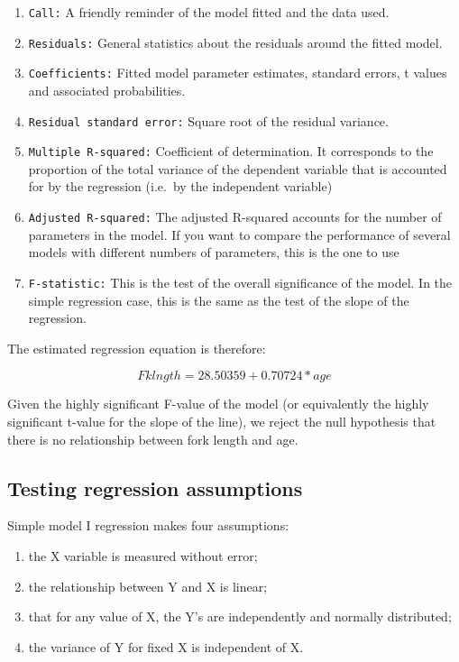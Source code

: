 \documentclass[
  12pt,
]{book}
\providecommand{\tightlist}{%
  \setlength{\itemsep}{0pt}\setlength{\parskip}{0pt}}
\begin{document}
\begin{enumerate}
\def\labelenumi{\arabic{enumi}.}
\tightlist
\item
  \texttt{Call:} A friendly reminder of the model fitted and the data used.
\item
  \texttt{Residuals:} General statistics about the residuals around the fitted model.
\item
  \texttt{Coefficients:} Fitted model parameter estimates, standard errors, t values and associated probabilities.
\item
  \texttt{Residual\ standard\ error:} Square root of the residual variance.
\item
  \texttt{Multiple\ R-squared:} Coefficient of determination. It corresponds to the proportion of the total variance of the dependent variable that is accounted for by the regression (i.e.~by the independent variable)
\item
  \texttt{Adjusted\ R-squared:} The adjusted R-squared accounts for the number of parameters in the model. If you want to compare the performance of several models with different numbers of parameters, this is the one to use
\item
  \texttt{F-statistic:} This is the test of the overall significance of the model. In the simple regression case, this is the same as the test of the slope of the
  regression.
\end{enumerate}

The estimated regression equation is therefore:

\[ Fklngth = 28.50359 + 0.70724 * age\]

Given the highly significant F-value of the model (or equivalently the highly significant t-value for the slope of the line), we reject the null hypothesis that there is no relationship between fork length and age.

\hypertarget{testing-regression-assumptions}{%
\subsection{Testing regression assumptions}\label{testing-regression-assumptions}}

Simple model I regression makes four assumptions:

\begin{enumerate}
\def\labelenumi{\arabic{enumi}.}
\tightlist
\item
  the X variable is measured without error;
\item
  the relationship between Y and X is linear;
\item
  that for any value of X, the Y's are independently and normally distributed;
\item
  the variance of Y for fixed X is independent of X.
\end{enumerate}
\end{document}
